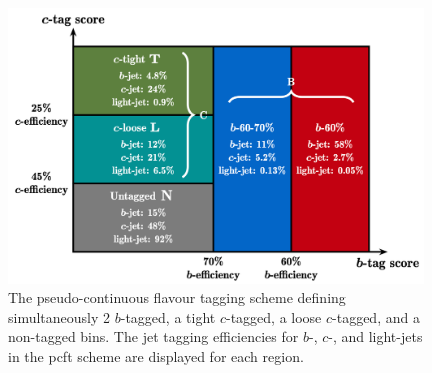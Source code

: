 \begin{itemize}[leftmargin=*]

\begin{figure}[h!]
  \center
    \begin{minipage}[c]{0.65\textwidth}
      \includegraphics[width=0.98\textwidth]{Images/VH/pseudocontinuous.png}
    \end{minipage}
    \begin{minipage}[c]{0.34\textwidth}
      \caption{The pseudo-continuous flavour tagging scheme defining simultaneously 2 $b$-tagged, a tight $c$-tagged, a loose $c$-tagged, and a non-tagged bins. The jet tagging efficiencies for $b$-, $c$-, and light-jets in the \gls{pcft} scheme are displayed for each region.} 
      \label{fig:pseudotag}
    \end{minipage}
\end{figure}


\end{itemize}
